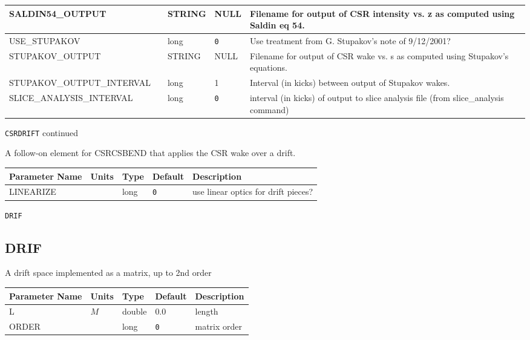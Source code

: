\begin{tabular}{|l|l|l|l|p{\descwidth}|}
SALDIN54\_OUTPUT &  & STRING &   NULL            & Filename for output of CSR intensity vs. z as computed using Saldin eq 54.  \\ \hline 
USE\_STUPAKOV &  & long &  \verb|0| & Use treatment from G. Stupakov's note of 9/12/2001?  \\ \hline 
STUPAKOV\_OUTPUT &  & STRING &   NULL            & Filename for output of CSR wake vs. s as computed using Stupakov's equations.  \\ \hline 
STUPAKOV\_OUTPUT\_INTERVAL &  & long &   1               & Interval (in kicks) between output of Stupakov wakes.  \\ \hline 
SLICE\_ANALYSIS\_INTERVAL &  & long &  \verb|0| & interval (in kicks) of output to slice analysis file (from slice\_analysis command)  \\ \hline 
\end{tabular}

\begin{latexonly}
\newpage
\begin{center}{\Large\verb|CSRDRIFT| continued}\end{center}
\end{latexonly}
A follow-on element for CSRCSBEND that applies the CSR wake over a drift.
\\
\begin{tabular}{|l|l|l|l|p{\descwidth}|} \hline
Parameter Name & Units & Type & Default & Description \\ \hline 
LINEARIZE &  & long &  \verb|0| & use linear optics for drift pieces?  \\ \hline 
\end{tabular}

\vspace*{0.5in}

\begin{latexonly}
\newpage
\begin{center}{\Large\verb|DRIF|}\end{center}
\end{latexonly}\subsection{DRIF}
A drift space implemented as a matrix, up to 2nd order
\\
\begin{tabular}{|l|l|l|l|p{\descwidth}|} \hline
Parameter Name & Units & Type & Default & Description \\ \hline 
L & $M$ & double &  0.0 & length  \\ \hline 
ORDER &  & long &  \verb|0| & matrix order  \\ \hline 
\end{tabular}

